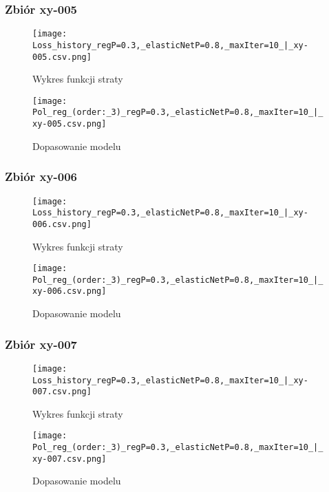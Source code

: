 \documentclass{article}
\begin{document}
\subsubsection{Zbiór xy-005}
\begin{figure}[H]
    \centering
    \begin{minipage}{0.45\textwidth}
        \texttt{[image: Loss\_history\_regP=0.3,\_elasticNetP=0.8,\_maxIter=10\_|\_xy-005.csv.png]}
        \caption{Wykres funkcji straty}
    \end{minipage}
    \hfill
    \begin{minipage}{0.45\textwidth}
        \texttt{[image: Pol\_reg\_(order:\_3)\_regP=0.3,\_elasticNetP=0.8,\_maxIter=10\_|\_xy-005.csv.png]}
        \caption{Dopasowanie modelu}
    \end{minipage}
\end{figure}

\subsubsection{Zbiór xy-006}
\begin{figure}[H]
    \centering
    \begin{minipage}{0.45\textwidth}
        \texttt{[image: Loss\_history\_regP=0.3,\_elasticNetP=0.8,\_maxIter=10\_|\_xy-006.csv.png]}
        \caption{Wykres funkcji straty}
    \end{minipage}
    \hfill
    \begin{minipage}{0.45\textwidth}
        \texttt{[image: Pol\_reg\_(order:\_3)\_regP=0.3,\_elasticNetP=0.8,\_maxIter=10\_|\_xy-006.csv.png]}
        \caption{Dopasowanie modelu}
    \end{minipage}
\end{figure}

\subsubsection{Zbiór xy-007}
\begin{figure}[H]
    \centering
    \begin{minipage}{0.45\textwidth}
        \texttt{[image: Loss\_history\_regP=0.3,\_elasticNetP=0.8,\_maxIter=10\_|\_xy-007.csv.png]}
        \caption{Wykres funkcji straty}
    \end{minipage}
    \hfill
    \begin{minipage}{0.45\textwidth}
        \texttt{[image: Pol\_reg\_(order:\_3)\_regP=0.3,\_elasticNetP=0.8,\_maxIter=10\_|\_xy-007.csv.png]}
        \caption{Dopasowanie modelu}
    \end{minipage}
\end{figure}
\end{document}
